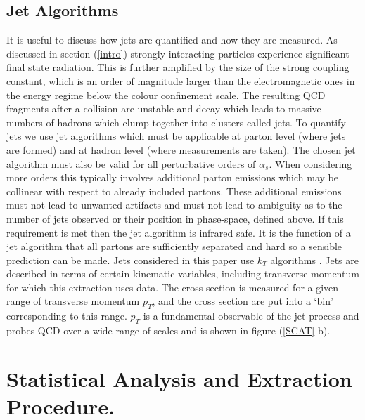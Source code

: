 \documentclass[12pt, onecolumn, nofootinbib]{revtex4}    %
\begin{document}
\subsection{Jet Algorithms}
It is useful to discuss how jets are quantified and how they are measured. As discussed in section (\ref{intro}) strongly interacting particles experience significant final state radiation. This is further amplified by the size of the strong coupling constant, which is an order of magnitude larger than the electromagnetic ones in the energy regime below the colour confinement scale. The resulting QCD fragments after a collision are unstable and decay which leads to massive numbers of hadrons which clump together into clusters called jets. To quantify jets we use jet algorithms which must be applicable at parton level (where jets are formed) and at hadron level (where measurements are taken). The chosen jet algorithm must also be valid for all perturbative orders of ${\alpha_s}$. When considering more orders this typically involves additional parton emissions which may be collinear with respect to already included partons.  These additional emissions must not lead to unwanted artifacts and must not lead to ambiguity as to the number of jets observed or their position in phase-space, defined above. If this requirement is met then the jet algorithm is infrared safe. It is the function of a jet algorithm that all partons are sufficiently separated and hard so a sensible prediction can be made. Jets considered in this paper use ${k_T}$ algorithms \cite{BLACK}. Jets are described in terms of certain kinematic variables, including transverse momentum for which this extraction uses data. The cross section is measured for a given range of transverse momentum ${p_T}$, and the cross section are put into a `bin' corresponding to this range. ${p_T}$ is a fundamental observable of the jet process and probes QCD over a wide range of scales \cite{HEPP} and is shown in figure (\ref{SCAT} b).

\section{Statistical Analysis and Extraction Procedure.} \label{stats}
\end{document}
